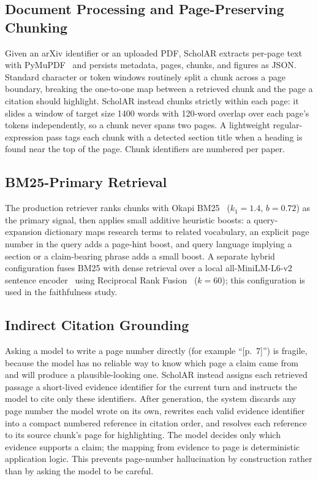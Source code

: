 \documentclass[letterpaper]{article} %
\begin{document}
\subsection{Document Processing and Page-Preserving Chunking}
Given an arXiv identifier or an uploaded PDF, ScholAR extracts per-page text with
PyMuPDF~\citep{pymupdf} and persists metadata, pages, chunks, and figures as JSON.
Standard character or token windows routinely split a chunk across a page boundary,
breaking the one-to-one map between a retrieved chunk and the page a citation should
highlight. ScholAR instead chunks strictly within each page: it slides a window of
target size 1400 words with 120-word overlap over each page's tokens independently,
so a chunk never spans two pages. A lightweight regular-expression pass tags each
chunk with a detected section title when a heading is found near the top of the
page. Chunk identifiers are numbered per paper.

\subsection{BM25-Primary Retrieval}
The production retriever ranks chunks with Okapi BM25~\citep{robertson2009bm25}
($k_1{=}1.4$, $b{=}0.72$) as the primary signal, then applies small additive
heuristic boosts: a query-expansion dictionary maps research terms to related
vocabulary, an explicit page number in the query adds a page-hint boost, and query
language implying a section or a claim-bearing phrase adds a small boost. A separate
hybrid configuration fuses BM25 with dense retrieval over a local
all-MiniLM-L6-v2 sentence encoder~\citep{reimers2019sbert} using Reciprocal Rank
Fusion~\citep{cormack2009rrf} ($k{=}60$); this configuration is used in the
faithfulness study.

\subsection{Indirect Citation Grounding}
Asking a model to write a page number directly (for example ``[p.~7]'') is fragile,
because the model has no reliable way to know which page a claim came from and will
produce a plausible-looking one. ScholAR instead assigns each retrieved passage a
short-lived evidence identifier for the current turn and instructs the model to cite
only these identifiers. After generation, the system discards any page number the
model wrote on its own, rewrites each valid evidence identifier into a compact
numbered reference in citation order, and resolves each reference to its source
chunk's page for highlighting. The model decides only which evidence supports a
claim; the mapping from evidence to page is deterministic application logic. This
prevents page-number hallucination by construction rather than by asking the model
to be careful.
\end{document}
